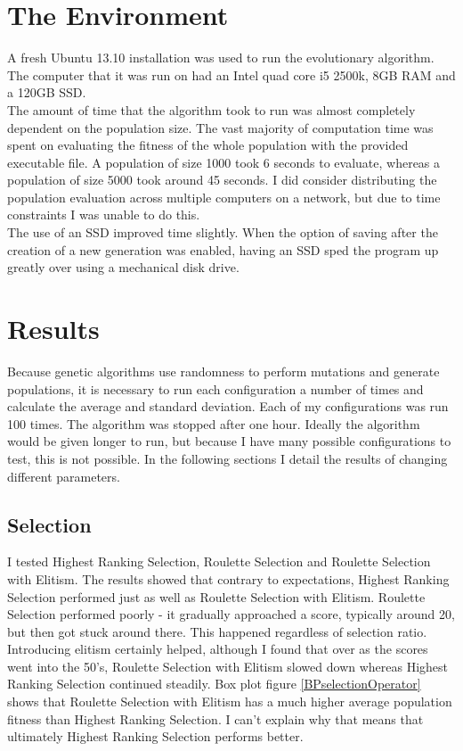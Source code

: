 \documentclass[]{report}
\begin{document}
\section{The Environment}
A fresh Ubuntu 13.10 installation was used to run the evolutionary algorithm. The computer that it was run on had an Intel quad core i5 2500k, 8GB RAM and a 120GB SSD. \\

The amount of time that the algorithm took to run was almost completely dependent on the population size. The vast majority of computation time was spent on evaluating the fitness of the whole population with the provided executable file. A population of size 1000 took 6 seconds to evaluate, whereas a population of size 5000 took around 45 seconds. I did consider distributing the population evaluation across multiple computers on a network, but due to time constraints I was unable to do this.\\

The use of an SSD improved time slightly. When the option of saving after the creation of a new generation was enabled, having an SSD sped the program up greatly over using a mechanical disk drive.

\section{Results} 
Because genetic algorithms use randomness to perform mutations and generate populations, it is necessary to run each configuration a number of times and calculate the average and standard deviation. Each of my configurations was run 100 times. The algorithm was stopped after one hour. Ideally the algorithm would be given longer to run, but because I have many possible configurations to test, this is not possible. In the following sections I detail the results of changing different parameters.

\subsection{Selection}

I tested Highest Ranking Selection, Roulette Selection and Roulette Selection with Elitism. The results showed that contrary to expectations, Highest Ranking Selection performed just as well as Roulette Selection with Elitism. Roulette Selection performed poorly - it gradually approached a score, typically around 20, but then got stuck around there. This happened regardless of selection ratio. Introducing elitism certainly helped, although I found that over as the scores went into the 50's, Roulette Selection with Elitism slowed down whereas Highest Ranking Selection continued steadily. Box plot figure \ref{BPselectionOperator} shows that Roulette Selection with Elitism has a much higher average population fitness than Highest Ranking Selection. I can't explain why that means that ultimately Highest Ranking Selection performs better.
\end{document}
